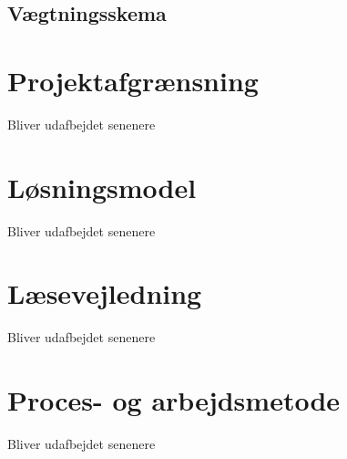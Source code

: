 \subsection{Vægtningsskema}

\section{Projektafgrænsning}
Bliver udafbejdet senenere

\section{Løsningsmodel}
Bliver udafbejdet senenere

\section{Læsevejledning}
Bliver udafbejdet senenere

\section{Proces- og arbejdsmetode}
Bliver udafbejdet senenere
